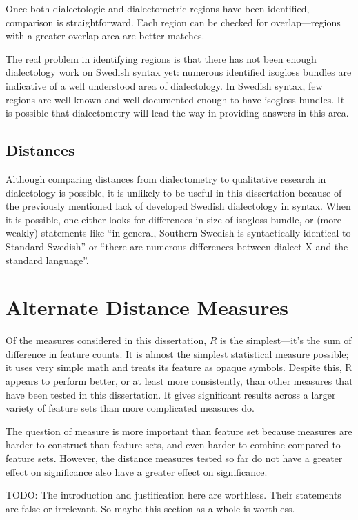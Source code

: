 Once both dialectologic and dialectometric regions have been
identified, comparison is straightforward. Each region can be checked
for overlap---regions with a greater overlap area are better matches.

The real problem in identifying regions is that there has not been
enough dialectology work on Swedish syntax yet: numerous identified
isogloss bundles are indicative of a well understood area of
dialectology. In Swedish syntax, few regions are well-known and
well-documented enough to have isogloss bundles. It is possible that
dialectometry will lead the way in providing answers in this
area.

\subsection{Distances}

Although comparing distances from dialectometry to qualitative
research in dialectology is possible, it is unlikely to be useful in
this dissertation because of the previously mentioned lack of
developed Swedish dialectology in syntax. When it is possible,
one either looks for differences in size of isogloss bundle, or (more
weakly) statements like ``in general, Southern
Swedish is syntactically identical to Standard Swedish''
\cite{rosenkvist07} or ``there are numerous differences between
dialect X and the standard language''.

\section{Alternate Distance Measures}

Of the measures considered in this dissertation, $R$ is the
simplest---it's the sum of difference in feature counts. It is almost
the simplest statistical measure possible; it uses very simple math
and treats its feature as opaque symbols.  Despite this, R appears to
perform better, or at least more consistently, than other measures
that have been tested in this dissertation. It gives significant
results across a larger variety of feature sets than more complicated
measures do.

The question of measure is more important than feature set because
measures are harder to construct than feature sets, and even harder to
combine compared to feature sets. However, the distance measures
tested so far do not have a greater effect on significance also have a
greater effect on significance.

TODO: The introduction and justification here are worthless. Their
statements are false or irrelevant. So maybe this section as a whole
is worthless.

